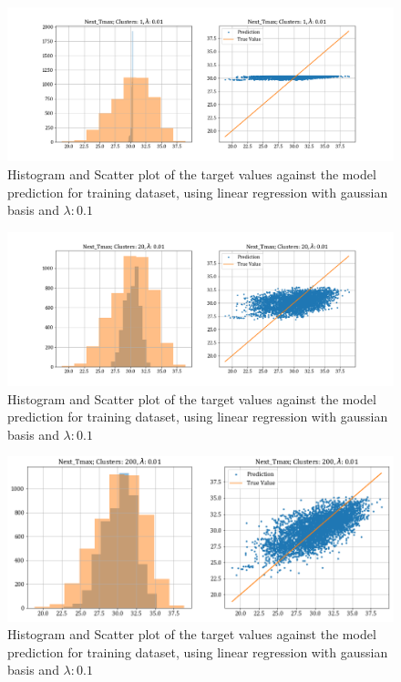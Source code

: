 \documentclass[12pt,a4paper]{article}
\begin{document}
\begin{itemize}
    \begin{figure}[H]
        \centering
        \includegraphics[scale=0.4]{images/t3_d3/reg/T_max_nclu_1_lambda_0.01.png}
        \caption{Histogram and Scatter plot of the target values against the model prediction for training dataset, using linear regression with gaussian basis and $\lambda: 0.1$}
    \end{figure}
    \begin{figure}[H]
        \centering
        \includegraphics[scale=0.4]{images/t3_d3/reg/T_max_nclu_20_lambda_0.01.png}
        \caption{Histogram and Scatter plot of the target values against the model prediction for training dataset, using linear regression with gaussian basis and $\lambda: 0.1$}
    \end{figure}
    \begin{figure}[H]
        \centering
        \includegraphics[scale=0.4]{images/t3_d3/reg/T_max_nclu_200_lambda_0.01.png}
        \caption{Histogram and Scatter plot of the target values against the model prediction for training dataset, using linear regression with gaussian basis and $\lambda: 0.1$}
    \end{figure}
\end{itemize}
\end{document}
